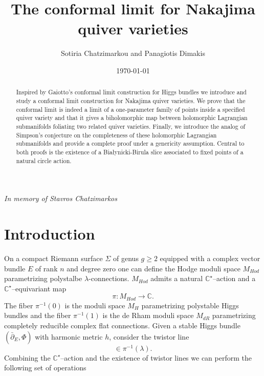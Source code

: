 \documentclass[12pt,oneside,reqno]{amsart}
\theoremstyle{definition}
\numberwithin{equation}{section}
\numberwithin{theorem}{section}
\newcommand{\C}{\mathbb{C}}
\newcommand{\pa}{\partial}
\begin{document}
\title{The conformal limit for Nakajima quiver varieties}


\author[Sotiria Chatzimarkou and Panagiotis Dimakis]{Sotiria Chatzimarkou and Panagiotis Dimakis}
\keywords{}
\subjclass[2010]{}
\date{\today}
\begin{abstract}
Inspired by Gaiotto's conformal limit construction for Higgs bundles we introduce and study a conformal limit construction for Nakajima quiver varieties. We prove that the conformal limit is indeed a limit of a one-parameter family of points inside a specified quiver variety and that it gives a biholomorphic map between holomorphic Lagrangian submanifolds foliating two related quiver varieties. Finally, we introduce the analog of Simpson's conjecture on the completeness of these holomorphic Lagrangian submanifolds and provide a complete proof under a genericity assumption. Central to both proofs is the existence of a Bia\l{}ynicki-Birula slice associated to fixed points of a natural circle action. 
\end{abstract}

\maketitle

\begin{center}
\textit{In memory of Stavros Chatzimarkos}
\end{center}

\tableofcontents

\section{Introduction}

On a compact Riemann surface $\Sigma$ of genus $g\ge 2$ equipped with a complex vector bundle $E$ of rank $n$ and degree zero one can define the Hodge moduli space $M_{Hod}$ parametrizing polystalbe $\lambda$-connections. $M_{Hod}$ admits a natural $\C^{\star}$--action and a $\C^{\star}$--equivariant map 
%
\begin{equation*}
\pi:M_{Hod} \to \C.
\end{equation*}
%
The fiber $\pi^{-1}(0)$ is the moduli space $M_H$ parametrizing polystable Higgs bundles and the fiber $\pi^{-1}(1)$ is the de Rham moduli space $M_{dR}$ parametrizing completely reducible complex flat connections. Given a stable Higgs bundle $(\bar\pa_E,\Phi)$ with harmonic metric $h$, consider the twistor line 
%
\begin{equation*}
[(\lambda, \bar\pa_E + \lambda\Phi^{\dagger_h}, \lambda\pa_E^{\dagger_h} + \Phi)] \in \pi^{-1}(\lambda). 
\end{equation*}
%
Combining the $\C^{\star}$--action and the existence of twistor lines we can perform the following set of operations 
\end{document}
